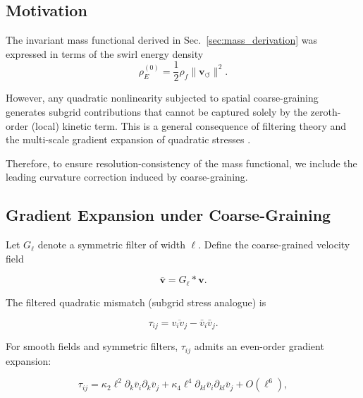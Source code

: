 \documentclass[11pt]{article}
\theoremstyle{definition}
\theoremstyle{plain}
\theoremstyle{remark}
\begin{document}
    \subsection{Motivation}

        The invariant mass functional derived in Sec.~\ref{sec:mass_derivation}
        was expressed in terms of the swirl energy density
        \begin{equation}
            \rho_{\!E}^{(0)} = \frac12 \rho_{\!f}
            \lVert \mathbf{v}_{\!\boldsymbol{\circlearrowleft}} \rVert^2.
        \end{equation}

        However, any quadratic nonlinearity subjected to spatial coarse-graining
        generates subgrid contributions that cannot be captured solely by
        the zeroth-order (local) kinetic term.
        This is a general consequence of filtering theory and the
        multi-scale gradient expansion of quadratic stresses
        \cite{Leonard1975,Clark1979,Eyink2006,Sagaut2006}.

        Therefore, to ensure resolution-consistency of the mass functional,
        we include the leading curvature correction induced by coarse-graining.


    \subsection{Gradient Expansion under Coarse-Graining}

        Let $G_\ell$ denote a symmetric filter of width $\ell$.
        Define the coarse-grained velocity field

        \begin{equation}
            \bar{\mathbf{v}} = G_\ell * \mathbf{v}.
        \end{equation}

        The filtered quadratic mismatch (subgrid stress analogue) is

        \begin{equation}
            \tau_{ij} = \overline{v_i v_j} - \bar v_i \bar v_j.
        \end{equation}

        For smooth fields and symmetric filters,
        $\tau_{ij}$ admits an even-order gradient expansion:

        \begin{equation}
            \tau_{ij}
            =
            \kappa_2 \ell^2
            \partial_k \bar v_i \partial_k \bar v_j
            +
            \kappa_4 \ell^4
            \partial_{kl} \bar v_i \partial_{kl} \bar v_j
            +
            O(\ell^6),
            \label{eq:SST_gradient_expansion}
        \end{equation}
\end{document}
